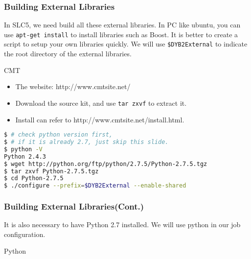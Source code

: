 \begin{frame}
    \frametitle{Building External Libraries}
    In SLC5, we need build all these external libraries.
    In PC like ubuntu, you can use {\tt apt-get install} to install
    libraries such as Boost.
    It is better to create a script to setup your own
    libraries quickly.
    We will use {\tt \$DYB2External} to indicate the root directory
    of the external libraries.
    \begin{block}{CMT}
        \begin{itemize}
            \item The website: http://www.cmtsite.net/
            \item Download the source kit, and use 
                {\tt tar zxvf} to extract it.
            \item Install can refer to 
                http://www.cmtsite.net/install.html.
        \end{itemize}
        \par\usebox{\installcmt}
    \end{block}
\end{frame}

\newsavebox{\installpython}
\begin{lrbox}{\installpython}
\begin{lstlisting}[language=bash]
$ # check python version first, 
$ # if it is already 2.7, just skip this slide.
$ python -V
Python 2.4.3
$ wget http://python.org/ftp/python/2.7.5/Python-2.7.5.tgz
$ tar zxvf Python-2.7.5.tgz 
$ cd Python-2.7.5
$ ./configure --prefix=$DYB2External --enable-shared
\end{lstlisting}
\end{lrbox}

\begin{frame}
    \frametitle{Building External Libraries(Cont.)}
    It is also necessary to have Python 2.7 installed.
    We will use python in our job configuration.

    \begin{block}{Python}
    \end{block}
\end{frame}
